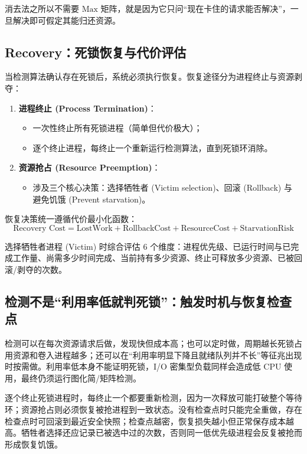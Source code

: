 \documentclass[11pt,a4paper]{ctexart}
\newcommand{\kw}[1]{\textbf{#1}}
\begin{document}
消去法之所以不需要 $\text{Max}$ 矩阵，就是因为它只问“现在卡住的请求能否解决”，一旦解决即可假定其能归还资源。

\subsection{Recovery：死锁恢复与代价评估}

当检测算法确认存在死锁后，系统必须执行恢复。恢复途径分为进程终止与资源剥夺：

\begin{enumerate}
\item \kw{进程终止 (Process Termination)}：
\begin{itemize}
\item 一次性终止所有死锁进程（简单但代价极大）；
\item 逐个终止进程，每终止一个重新运行检测算法，直到死锁环消除。
\end{itemize}
\item \kw{资源抢占 (Resource Preemption)}：
\begin{itemize}
\item 涉及三个核心决策：选择牺牲者 (Victim selection)、回滚 (Rollback) 与 避免饥饿 (Prevent starvation)。
\end{itemize}
\end{enumerate}

恢复决策统一遵循代价最小化函数：
\[
\boxed{\text{Recovery Cost} = \text{LostWork} + \text{RollbackCost} + \text{ResourceCost} + \text{StarvationRisk}}
\]

选择牺牲者进程 (Victim) 时综合评估 6 个维度：进程优先级、已运行时间与已完成工作量、尚需多少时间完成、当前持有多少资源、终止可释放多少资源、已被回滚/剥夺的次数。

\subsection{检测不是“利用率低就判死锁”：触发时机与恢复检查点}

检测可以在每次资源请求后做，发现快但成本高；也可以定时做，周期越长死锁占用资源和卷入进程越多；还可以在“利用率明显下降且就绪队列并不长”等征兆出现时按需做。利用率低本身不能证明死锁，I/O 密集型负载同样会造成低 CPU 使用，最终仍须运行图化简/矩阵检测。

逐个终止死锁进程时，每终止一个都要重新检测，因为一次释放可能打破整个等待环；资源抢占则必须恢复被抢进程到一致状态。没有检查点时只能完全重做，存在检查点时可回滚到最近安全快照；检查点越密，恢复损失越小但正常保存成本越高。牺牲者选择还应记录已被选中过的次数，否则同一低优先级进程会反复被抢而形成恢复饥饿。
\end{document}
